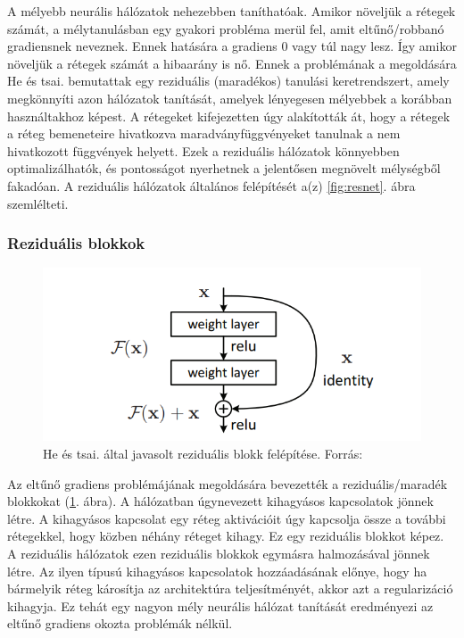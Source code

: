 \documentclass[12pt,a4]{article}
\begin{document}
    A mélyebb neurális hálózatok nehezebben taníthatóak. Amikor növeljük a rétegek számát, a mélytanulásban egy gyakori probléma merül fel, amit eltűnő/robbanó gradiensnek neveznek. Ennek hatására a gradiens 0 vagy túl nagy lesz. Így amikor növeljük a rétegek számát a hibaarány is nő. Ennek a problémának a megoldására He és tsai. \cite{resnet} bemutattak egy reziduális (maradékos) tanulási keretrendszert, amely megkönnyíti azon hálózatok tanítását, amelyek lényegesen mélyebbek a korábban használtakhoz képest. A rétegeket kifejezetten úgy alakították át, hogy a rétegek a réteg bemeneteire hivatkozva maradványfüggvényeket tanulnak a nem hivatkozott függvények helyett. Ezek a reziduális hálózatok könnyebben optimalizálhatók, és pontosságot nyerhetnek a jelentősen megnövelt mélységből fakadóan.
    A reziduális hálózatok általános felépítését a(z) \ref{fig:resnet}. ábra szemlélteti.

    \newpage
    \subsubsection{Reziduális blokkok}
    
    
    \begin{figure}[h]	
 		\centering
 		\includegraphics[width=1\linewidth]{Residual-Block}
 		\caption{He és tsai. által javasolt reziduális blokk felépítése.
 			Forrás: \cite{resnet}}
        \label{fig:resblock}
 	\end{figure}
  
    Az eltűnő gradiens problémájának megoldására bevezették a reziduális/maradék blokkokat (\ref{fig:resblock}. ábra). A hálózatban úgynevezett kihagyásos kapcsolatok jönnek létre. A kihagyásos kapcsolat egy réteg aktivációit úgy kapcsolja össze a további rétegekkel, hogy közben néhány réteget kihagy. Ez egy reziduális blokkot képez. A reziduális hálózatok ezen reziduális blokkok egymásra halmozásával jönnek létre. Az ilyen típusú kihagyásos kapcsolatok hozzáadásának előnye, hogy ha bármelyik réteg károsítja az architektúra teljesítményét, akkor azt a regularizáció kihagyja. Ez tehát egy nagyon mély neurális hálózat tanítását eredményezi az eltűnő gradiens okozta problémák nélkül. 
\end{document}
